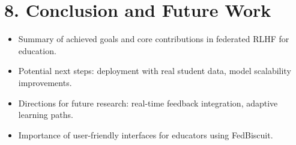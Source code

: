 \documentclass[headsepline,footsepline,footinclude=false,oneside,fontsize=10pt,paper=a4]{scrbook}
\begin{document}
\section*{8. Conclusion and Future Work}
\begin{itemize}[leftmargin=1.5em]
    \item Summary of achieved goals and core contributions in federated RLHF for education.
    \item Potential next steps: deployment with real student data, model scalability improvements.
    \item Directions for future research: real-time feedback integration, adaptive learning paths.
    \item Importance of user-friendly interfaces for educators using FedBiscuit.
\end{itemize}

\end{document}
